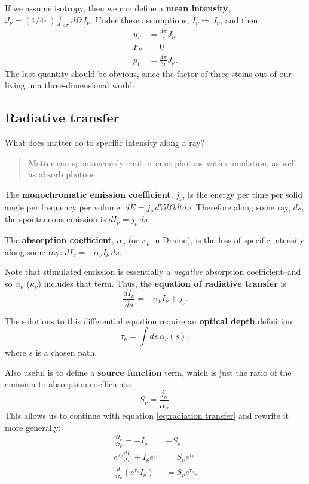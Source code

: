 \documentclass{tufte-handout}
\renewcommand{\textbf}[1]{{\bf \textcolor{dark-gray}{#1}}}
\begin{document}
If we assume isotropy, then we can define a \textbf{mean intensity}, $J_\nu = (1/4\pi) \int_{4\pi} d\Omega\, I_\nu$. Under these assumptions, $I_\nu \Rightarrow J_\nu$, and then:
\begin{align*}
u_\nu &= \frac{4\pi}{c} J_\nu \\
F_\nu &= 0 \\
p_\nu &= \frac{4\pi}{3c} J_\nu.
\end{align*}
The last quantity should be obvious, since the factor of three stems out of our living in a three-dimensional world.

\subsection{Radiative transfer}
What does matter do to specific intensity along a ray?
\begin{quote}
Matter can spontaneously emit or emit photons with stimulation, as well as absorb photons.
\end{quote}

The \textbf{monochromatic emission coefficient}, $j_\nu$, is the energy per time per solid angle per frequency per volume: $dE = j_\nu\, dV d\Omega dt d\nu$. Therefore along some ray, $ds$, the spontaneous emission is $dI_\nu = j_\nu\, ds$.

The \textbf{absorption coefficient}, $\alpha_\nu$ (or $\kappa_\nu$ in Draine), is the loss of specific intensity along some ray: $dI_\nu = -\alpha_\nu I_\nu\, ds$.

Note that stimulated emission is essentially a \textit{negative} absorption coefficient--and so $\alpha_\nu$ ($\kappa_\nu$) includes that term. Thus, the \textbf{equation of radiative transfer} is
\begin{equation} \label{eq:radiation transfer}
\frac{dI_\nu}{ds} = -\alpha_\nu I_\nu + j_\nu.
\end{equation}

The solutions to this differential equation require an \textbf{optical depth} definition:
\begin{equation}
\tau_\nu = \int ds\, \alpha_\nu(s),
\end{equation}
where $s$ is a chosen path.

Also useful is to define a \textbf{source function} term, which is just the ratio of the emission to absorption coefficients:
\begin{equation}
S_\nu = \frac{j_\nu}{\alpha_\nu}.
\end{equation}
This allows us to continue with equation \eqref{eq:radiation transfer} and rewrite it more generally:
\begin{align}
\frac{dI_\nu}{d\tau_\nu} = -I_\nu &+ S_\nu \nonumber \\
e^{\tau_\nu}\frac{dI_\nu}{d\tau_\nu} + I_\nu e^{\tau_\nu} &= S_\nu e^{\tau_\nu} \nonumber \\
\frac{d}{d\tau_\nu} \left (e^{\tau_\nu} I_\nu\right ) &= S_\nu e^{\tau_\nu}.
\end{align}
\end{document}
